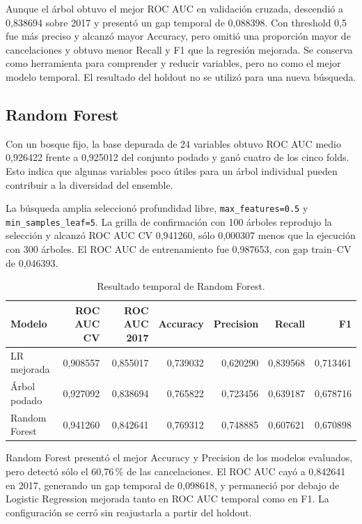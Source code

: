 Aunque el árbol obtuvo el mejor ROC AUC en validación cruzada, descendió a
0,838694 sobre 2017 y presentó un gap temporal de 0,088398. Con threshold 0,5
fue más preciso y alcanzó mayor Accuracy, pero omitió una proporción mayor de
cancelaciones y obtuvo menor Recall y F1 que la regresión mejorada. Se conserva
como herramienta para comprender y reducir variables, pero no como el mejor
modelo temporal. El resultado del holdout no se utilizó para una nueva
búsqueda.

\subsection{Random Forest}

Con un bosque fijo, la base depurada de 24 variables obtuvo ROC AUC medio
0,926422 frente a 0,925012 del conjunto podado y ganó cuatro de los cinco
folds. Esto indica que algunas variables poco útiles para un árbol individual
pueden contribuir a la diversidad del ensemble.

La búsqueda amplia seleccionó profundidad libre,
\texttt{max\_features=0.5} y \texttt{min\_samples\_leaf=5}. La grilla de
confirmación con 100 árboles reprodujo la selección y alcanzó ROC AUC CV
0,941260, sólo 0,000307 menos que la ejecución con 300 árboles. El ROC AUC de
entrenamiento fue 0,987653, con gap train--CV de 0,046393.

\begin{table}[htbp]
    \centering
    \caption{Resultado temporal de Random Forest.}
    \label{tab:random-forest-results}
    \begin{tabular}{lrrrrrr}
        \toprule
        Modelo & ROC AUC CV & ROC AUC 2017 & Accuracy & Precision & Recall & F1 \\
        \midrule
        LR mejorada & 0,908557 & 0,855017 & 0,739032 & 0,620290 & 0,839568 & 0,713461 \\
        Árbol podado & 0,927092 & 0,838694 & 0,765822 & 0,723456 & 0,639187 & 0,678716 \\
        Random Forest & 0,941260 & 0,842641 & 0,769312 & 0,748885 & 0,607621 & 0,670898 \\
        \bottomrule
    \end{tabular}
\end{table}

Random Forest presentó el mejor Accuracy y Precision de los modelos evaluados,
pero detectó sólo el 60,76\,\% de las cancelaciones. El ROC AUC cayó a 0,842641
en 2017, generando un gap temporal de 0,098618, y permaneció por debajo de
Logistic Regression mejorada tanto en ROC AUC temporal como en F1. La
configuración se cerró sin reajustarla a partir del holdout.

